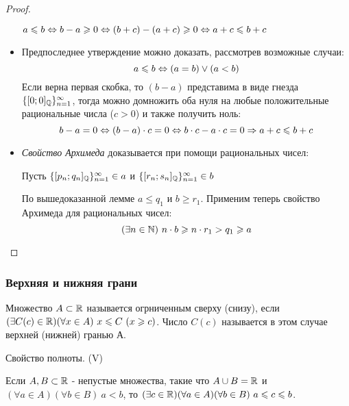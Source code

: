 \begin{proof}
\begin{itemize}
            $a \leqslant b \Leftrightarrow b - a \geqslant 0 \Leftrightarrow (b + c) - (a + c) \geqslant 0
            \Leftrightarrow a + c \leqslant b + c$
        
        \item Предпоследнее утверждение можно доказать, рассмотрев
            возможные случаи:
            \[
                a \leqslant b \Leftrightarrow (a = b) \vee (a < b)
            \]
            Если верна первая скобка, то $(b - a)$ представима
            в виде гнезда $\{[0; 0]_{\mathbb{Q}}\}_{n = 1}^\infty$, тогда
            можно домножить оба нуля на любые положительные
            рациональные числа ($c > 0$) и также получить ноль:
            \[
                b - a = 0 \Leftrightarrow (b - a) \cdot c = 0 \Leftrightarrow b \cdot c -
                a \cdot c = 0 \Rightarrow a + c \leqslant b + c
            \]

        \item \textit{Свойство Архимеда} доказывается при помощи
            рациональных чисел:
            
            Пусть $\{[p_n; q_n]_{\mathbb{Q}}\}_{n = 1}^\infty \in a$
            и $\{[r_n; s_n]_{\mathbb{Q}}\}_{n = 1}^\infty \in b$

            По вышедоказанной лемме 
            $a \le q_1$ и $b \ge r_1$. Применим
            теперь свойство Архимеда для рациональных чисел:
            \[
                (\exists n \in \mathbb{N})\ n \cdot b \geqslant n \cdot r_1 > q_1 \geqslant a     
            \]
    \end{itemize}
   
\end{proof}


\subsubsection*{Верхняя и нижняя грани}

\begin{definition}
    Множество $A \subset \mathbb{R}$ называется огрниченным
    сверху (снизу), если $(\exists C (c) \in \mathbb{R})
    (\forall x \in A)\ x \leqslant C \ (x \geqslant c)$. Число
    $C (c)$ называется в этом случае верхней (нижней)
    гранью А.
\end{definition}

\begin{theorem}
    Свойство полноты. (V)

    Если $A, B \subset \mathbb{R}$ - непустые множества,
    такие что $A \cup B = \mathbb{R}$ и $(\forall a \in A)
    (\forall b \in B)\ a < b$, то 
    $(\exists c \in \mathbb{R})(\forall a \in A)(\forall b \in B)
    \ a \leqslant c \leqslant b$.
\end{theorem}

